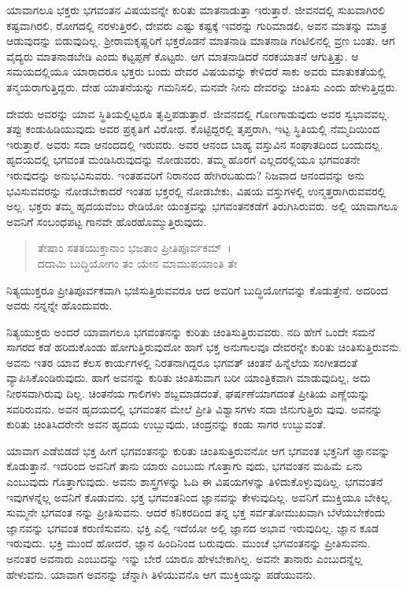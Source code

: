 ಯಾವಾಗಲೂ ಭಕ್ತರು ಭಗವಂತನ ವಿಷಯವನ್ನೇ ಕುರಿತು ಮಾತನಾಡುತ್ತಾ ಇರುತ್ತಾರೆ. ಜೀವನದಲ್ಲಿ ಸುಖವಾಗಿರಲಿ ಕಷ್ಟವಾಗಿರಲಿ, ರೋಗದಲ್ಲಿ ನರಳುತ್ತಿರಲಿ, ದೇವರು ಎಷ್ಟು ಕಷ್ಟಕ್ಕೆ ಇವರನ್ನು ಗುರಿಮಾಡಲಿ, ಅವನ ಮಾತನ್ನು ಮಾತ್ರ ಆಡುವುದನ್ನು ಬಿಡುವುದಿಲ್ಲ. ಶ‍್ರೀರಾಮಕೃಷ್ಣರಿಗೆ ಭಕ್ತರೊಡನೆ ಮಾತನಾಡಿ ಮಾತನಾಡಿ ಗಂಟಿಲಿನಲ್ಲಿ ವ್ರಣ  ಬಂತು. ಆಗ ವೈದ್ಯರು ಮಾತನಾಡಬೇಡಿ ಎಂದು ಕಟ್ಟಪ್ಪಣೆ ಕೊಟ್ಟರು. ಆಗ ಮಾತನಾಡಿದರೆ ನರಕಯಾತನೆ ಆಗುತ್ತಿತ್ತು. ಆ ಸಮಯದಲ್ಲಿಯೂ ಯಾರಾದರೂ ಭಕ್ತರು ಬಂದು ದೇವರ ವಿಷಯವನ್ನು ಕೇಳಿದರೆ ಸಾಕು ಅವರು ಮಾತುಕತೆಯಲ್ಲಿ ತನ್ಮಯರಾಗುತ್ತಿದ್ದರು. ದೇಹ ಯಾತನೆಯನ್ನು ಗಮನಿಸಲಿ, ಮನವೇ ನೀನು ದೇವರನ್ನು ಚಿಂತಿಸು ಎಂದು ಹೇಳುತ್ತಿದ್ದರು.

ದೇವರು ಅವರನ್ನು ಯಾವ ಸ್ಥಿತಿಯಲ್ಲಿಟ್ಟರೂ ತೃಪ್ತಿಪಡುತ್ತಾರೆ. ಜೀವನದಲ್ಲಿ ಗೊಣಗಾಡುವುದು ಅವರ ಸ್ವಭಾವವಲ್ಲ. ತಪ್ಪು ಕಂಡುಹಿಡಿಯುವುದು ಅವರ ಪ್ರಕೃತಿಗೆ ವಿರೋಧ. ಕೊಟ್ಟಿದ್ದರಲ್ಲಿ ತೃಪ್ತರಾಗಿ, ಇಟ್ಟ ಸ್ಥಿತಿಯಲ್ಲಿ ನೆಮ್ಮದಿಯಿಂದ ಇರುತ್ತಾರೆ. ಅವರು ಸದಾ ಆನಂದದಲ್ಲಿ ಇರುವರು. ಅವರ ಆನಂದ ಬಾಹ್ಯ ವಸ್ತುವಿನ ಸಂಘಾತದಿಂದ ಬಂದುದಲ್ಲ. ಹೃದಯದಲ್ಲಿ ಭಗವಂತ ಮಂಡಿಸಿರುವುದನ್ನು ನೋಡುವರು. ತಮ್ಮ ಹೊರಗೆ ಎಲ್ಲದರಲ್ಲಿಯೂ ಭಗವಂತನೇ ಇರುವುದನ್ನು ಅನುಭವಿಸುವರು. ಇಂತಹವರಿಗೆ ನಿರಾನಂದ ಹೇಗಿರಬಹುದು? ನಿಜವಾದ ಆನಂದವನ್ನು ಅನು ಭವಿಸುವವರನ್ನು ನೋಡಬೇಕಾದರೆ ಇಂತಹ ಭಕ್ತರಲ್ಲಿ ನೋಡಬೇಕು, ವಿಷಯ ವಸ್ತುಗಳಲ್ಲಿ ಉನ್ಮತ್ತರಾಗಿರುವವರಲ್ಲಿ ಅಲ್ಲ. ಭಕ್ತರು ತಮ್ಮ ಹೃದಯವೆಂಬ ರೇಡಿಯೋ ಯಂತ್ರವನ್ನು ಭಗವಂತನಕಡೆಗೆ ತಿರುಗಿಸಿರುವರು. ಅಲ್ಲಿ ಯಾವಾಗಲೂ ಅವನಿಗೆ ಸಂಬಂಧಪಟ್ಟ ಗಾನವೇ ಹೊರಹೊಮ್ಮುತ್ತಿರುವುದು.

\begin{verse}
ತೇಷಾಂ ಸತತಯುಕ್ತಾನಾಂ ಭಜತಾಂ ಪ್ರೀತಿಪೂರ್ವಕಮ್~।\\ದದಾಮಿ ಬುದ್ಧಿಯೋಗಂ ತಂ ಯೇನ ಮಾಮುಪಯಾಂತಿ ತೇ 
\end{verse}

{\small ನಿತ್ಯಯುಕ್ತರೂ ಪ್ರೀತಿಪೂರ್ವಕವಾಗಿ ಭಜಿಸುತ್ತಿರುವವರೂ ಆದ ಅವರಿಗೆ ಬುದ್ಧಿಯೋಗವನ್ನು ಕೊಡುತ್ತೇನೆ. ಅದರಿಂದ ಅವರು ನನ್ನನ್ನೇ ಹೊಂದುವರು.}

ನಿತ್ಯಯುಕ್ತರು ಅಂದರೆ ಯಾವಾಗಲೂ ಭಗವಂತನನ್ನು ಕುರಿತು ಚಿಂತಿಸುತ್ತಿರುವವರು. ನದಿ ಹೇಗೆ ಒಂದೇ ಸಮನೆ ಸಾಗರದ ಕಡೆ ಹರಿದುಕೊಂಡು ಹೋಗುತ್ತಿರುವುದೋ ಹಾಗೆ ಭಕ್ತ ಅನುಗಾಲವೂ ದೇವರನ್ನೇ ಕುರಿತು ಚಿಂತಿಸುತ್ತಿರುವನು. ಅವನು ಇತರ ಯಾವ ಕೆಲಸ ಕಾರ್ಯಗಳಲ್ಲಿ ನಿರತನಾಗಿದ್ದರೂ ಭಗವತ್ ಚಿಂತನೆ ಹಿನ್ನೆಲೆಯ ಸಂಗೀತದಂತೆ ವ್ಯಾಪಿಸಿಕೊಂಡಿರುವುದು. ಹಾಗೆ ಅವನನ್ನು ಕುರಿತು ಚಿಂತಿಸುವಾಗ ಬರೀ ಯಾಂತ್ರಿಕವಾಗಿ ಮಾಡುವುದಿಲ್ಲ, ಅದು ನೀರಸವಾಗಿರುವು ದಿಲ್ಲ. ಚಿಂತನೆಯ ಗಾಲಿಗಳು ಶಬ್ದಮಾಡದಂತೆ, ಘರ್ಷಣೆಯಾಗದಂತೆ ಪ್ರೀತಿಯ ಎಣ್ಣೆಯನ್ನು ಸವರಿರುವನು. ಅವನ ಹೃದಯದಲ್ಲಿ ಭಗವಂತನ ಮೇಲೆ ಪ್ರೀತಿ ವಿಶ್ವಾಸಗಳು ಸದಾ ಜಿನುಗುತ್ತಿರು ವುವು. ಅವನನ್ನು ಕುರಿತು ಚಿಂತಿಸಿದರೇನೇ ಅವನ ಹೃದಯ ಉಬ್ಬುವುದು, ಚಂದ್ರನನ್ನು ಕಂಡು ಸಾಗರ ಉಬ್ಬುವಂತೆ.

ಯಾವಾಗ ಎಡೆಬಿಡದೆ ಭಕ್ತ ಹೀಗೆ ಭಗವಂತನನ್ನು ಕುರಿತು ಚಿಂತಿಸುತ್ತಿರುವನೋ ಆಗ ಭಗವಂತ ಭಕ್ತನಿಗೆ ಜ್ಞಾನವನ್ನು ಕೊಡುತ್ತಾನೆ. ಇದರಿಂದ ಅವನಿಗೆ ತಾನು ಯಾರು ಎಂಬುದು ಗೊತ್ತಾಗು ವುದು, ಭಗವಂತನ ಮಹಿಮೆ ಏನು ಎಂಬುವುದು ಗೊತ್ತಾಗುವುದು. ಅವನು ಶಾಸ್ತ್ರಗಳನ್ನು ಓದಿ ಈ ವಿಷಯಗಳನ್ನು ತಿಳಿದುಕೊಳ್ಳುವುದಿಲ್ಲ. ಭಗವಂತನೆ ಇವುಗಳನ್ನೆಲ್ಲ ಅವನಿಗೆ ಕೊಡುವನು. ಭಕ್ತ ಭಗವಂತನಿಂದ ಜ್ಞಾನವನ್ನು ಕೇಳುವುದಿಲ್ಲ. ಅವನಿಗೆ ಮುಕ್ತಿಯೂ ಬೇಕಿಲ್ಲ. ಸುಮ್ಮನೇ ಭಗವಂತ ನನ್ನು ಪ್ರೀತಿಸುವನು. ಆದರೆ ಕನಿಕರದಿಂದ ತನ್ನ ಭಕ್ತ ಸರ್ವತೋಮುಖವಾಗಿ ಬೆಳೆಯಬೇಕೆಂದು ಜ್ಞಾನವನ್ನು ಭಗವಂತ ಕರುಣಿಸುವನು. ಭಕ್ತಿ ಎಲ್ಲಿ ಇದೆಯೋ ಅಲ್ಲಿ ಜ್ಞಾನದ ಅಭಾವ ಇರುವುದಿಲ್ಲ. ಜ್ಞಾನ ಕೂಡ ಇರುವುದು. ಭಕ್ತಿ ಮುಂದೆ ಹೋದರೆ, ಜ್ಞಾನ ಹಿಂದಿನಿಂದ ಬರುವುದು. ಮುಂಚೆ ಭಗವಂತನನ್ನು ಪ್ರೀತಿಸುವನು. ಅನಂತರ ಅವನಾರು ಎಂಬುದನ್ನು ಇನ್ನು ಬೇರೆ ಯಾರೂ ಹೇಳಬೇಕಾಗಿಲ್ಲ. ಅವನೇ ತಾನಾರು ಎಂಬುದನ್ನೆಲ್ಲ ಹೇಳುವನು. ಯಾವಾಗ ಅವನನ್ನು ಚೆನ್ನಾಗಿ ತಿಳಿಯುವನೊ ಆಗ ಮುಕ್ತಿಯನ್ನು ಪಡೆಯುವನು.

